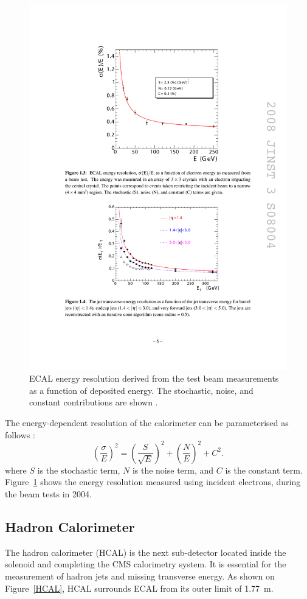 \begin{figure}[htbp]
  \begin{center}
    \leavevmode
    \includegraphics[width=0.7\columnwidth]{ECAL_resolution}
    \caption{ECAL energy resolution derived from the test beam measurements as a function of deposited energy. The
    stochastic, noise, and constant contributions are shown \cite{CMS}.}
    \label{ECAL_resolution}
  \end{center}
\end{figure}

The energy-dependent resolution of the calorimeter can be parameterised as follows \cite{CMS}:
\begin{equation}
  \left(\frac{\sigma}{E}\right)^2 = \left(\frac{S}{\sqrt E}\right)^2 + \left(\frac{N}{E}\right)^2 + C^2.
\end{equation}
where $S$ is the stochastic term, $N$ is the noise term, and $C$ is the constant term. Figure~\ref{ECAL_resolution}
shows the energy resolution measured using incident electrons, during the beam tests in 2004.

\subsection{Hadron Calorimeter}
The hadron calorimeter (HCAL) is the next sub-detector located inside the solenoid and completing the CMS calorimetry
system. It is essential for the measurement of hadron jets and missing transverse energy. As shown on Figure~\ref{HCAL},
HCAL surrounds ECAL from its outer limit of \SI{1.77}{m}.

